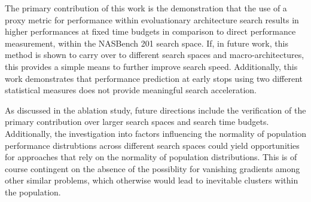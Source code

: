 \documentclass[twocolumn]{article}
\begin{document}
The primary contribution of this work is the demonstration that the use of a proxy metric for performance within evoluationary architecture search
results in higher performances at fixed time budgets in comparison to direct performance measurement, within the NASBench 201 search space.
If, in future work, this method is shown to carry over to different search spaces and macro-architectures, this provides a simple
means to further improve search speed.
Additionally, this work demonstrates that performance prediction at early stops using two different statistical measures does not provide meaningful search acceleration.

As discussed in the ablation study, future directions include the verification of the primary contribution over larger search spaces and search time budgets.
Additionally, the investigation into factors influencing the normality of population performance distrubtions across different search spaces
could yield opportunities for approaches that rely on the normality of population distributions. 
This is of course contingent on the absence of the possiblity for vanishing gradients among other similar problems, which otherwise would
lead to inevitable clusters within the population.
\end{document}
